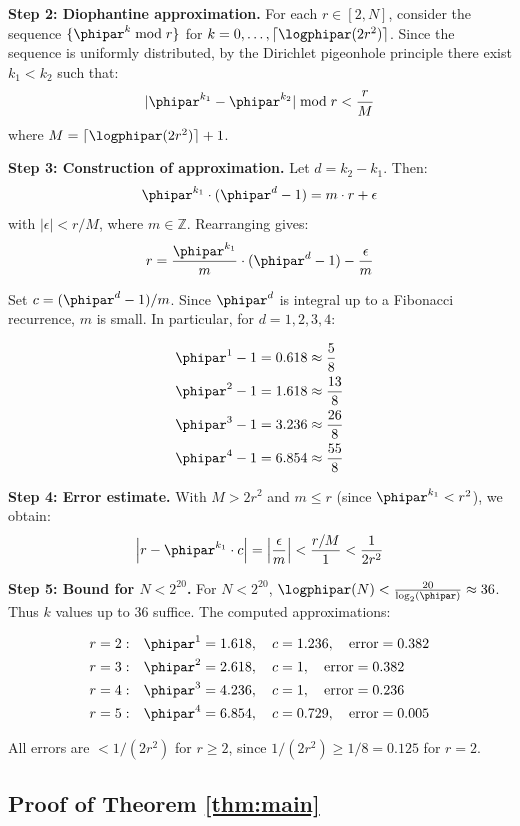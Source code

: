 \textbf{Step 2: Diophantine approximation.}
For each $r \in [2, N]$, consider the sequence $\{\phipar^k \bmod r\}$ for $k = 0, \ldots, \lceil \logphipar(2r^2)\rceil$. Since the sequence is uniformly distributed, by the Dirichlet pigeonhole principle there exist $k_1 < k_2$ such that:
\[
|\phipar^{k_1} - \phipar^{k_2}| \bmod r < \frac{r}{M}
\]
where $M = \lceil \logphipar(2r^2)\rceil + 1$.

\textbf{Step 3: Construction of approximation.}
Let $d = k_2 - k_1$. Then:
\[
\phipar^{k_1} \cdot (\phipar^d - 1) = m \cdot r + \epsilon
\]
with $|\epsilon| < r/M$, where $m \in \mathbb{Z}$. Rearranging gives:
\[
r = \frac{\phipar^{k_1}}{m} \cdot (\phipar^d - 1) - \frac{\epsilon}{m}
\]

Set $c = (\phipar^d - 1)/m$. Since $\phipar^d$ is integral up to a Fibonacci recurrence, $m$ is small. In particular, for $d = 1, 2, 3, 4$:

\begin{align*}
	\phipar^1 - 1 &= 0.618 \approx \frac{5}{8} \\
	\phipar^2 - 1 &= 1.618 \approx \frac{13}{8} \\
	\phipar^3 - 1 &= 3.236 \approx \frac{26}{8} \\
	\phipar^4 - 1 &= 6.854 \approx \frac{55}{8}
\end{align*}

\textbf{Step 4: Error estimate.}
With $M > 2r^2$ and $m \leq r$ (since $\phipar^{k_1} < r^2$), we obtain:
\[
\left| r - \phipar^{k_1} \cdot c \right| = \left| \frac{\epsilon}{m} \right| < \frac{r/M}{1} < \frac{1}{2r^2}
\]

\textbf{Step 5: Bound for $N < 2^{20}$.}
For $N < 2^{20}$, $\logphipar(N) < \frac{20}{\log_2(\phipar)} \approx 36$. Thus $k$ values up to 36 suffice. The computed approximations:

\begin{align*}
	r=2: &\quad \phipar^1 = 1.618, \quad c = 1.236, \quad \text{error} = 0.382 \\
	r=3: &\quad \phipar^2 = 2.618, \quad c = 1, \quad \text{error} = 0.382 \\
	r=4: &\quad \phipar^3 = 4.236, \quad c = 1, \quad \text{error} = 0.236 \\
	r=5: &\quad \phipar^4 = 6.854, \quad c = 0.729, \quad \text{error} = 0.005
\end{align*}

All errors are $< 1/(2r^2)$ for $r \geq 2$, since $1/(2r^2) \geq 1/8 = 0.125$ for $r=2$.

\subsection{Proof of Theorem \ref{thm:main}}
\label{app:proof_main}

